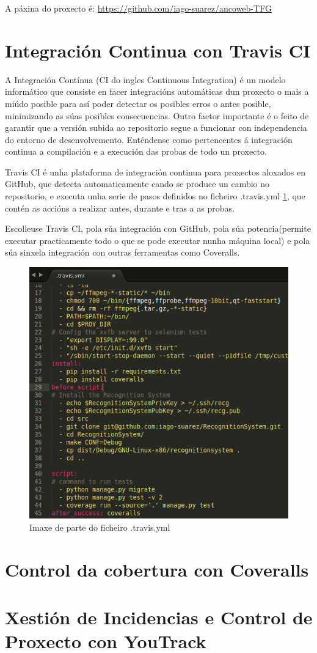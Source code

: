 	A páxina do proxecto é: \url{https://github.com/iago-suarez/ancoweb-TFG} 
	
\section{Integración Continua con Travis CI}

	A Integración Contínua (CI do ingles Continuous Integration) é un modelo informático que 
	consiste en facer integracións automáticas dun proxecto o mais a miúdo posible para así 
	poder detectar os posibles erros o antes posible, minimizando as súas posibles consecuencias.
	Outro factor importante é o feito de garantir que a versión subida ao repositorio segue a
	funcionar con independencia do entorno de desenvolvemento. Enténdense como pertencentes á 
	integración continua a compilación e a execución das probas de todo un proxecto.
	
	Travis CI é unha plataforma de integración continua para proxectos aloxados en GitHub, que 
	detecta automaticamente cando se produce un cambio no repositorio, e executa unha serie de pasos 
	definidos no ficheiro .travis.yml \ref{fig:travisYml}, que contén as accións a realizar 
	antes, durante e tras a as probas.
	
	Escolleuse Travis CI, pola súa integración con GitHub, pola súa potencia(permite executar 
	practicamente todo o que se pode executar nunha máquina local) e pola súa sinxela integración
	con outras ferramentas como Coveralls.
	
	\begin{figure}[htp]
	\begin{center}
		\includegraphics[scale=0.6]{figures/travisYml.png}
		\caption{Imaxe de parte do ficheiro .travis.yml}
	\label{fig:travisYml}
	\end{center}
	\end{figure}
	
	
\section{Control da cobertura con Coveralls}
\section{Xestión de Incidencias e Control de Proxecto con YouTrack}
